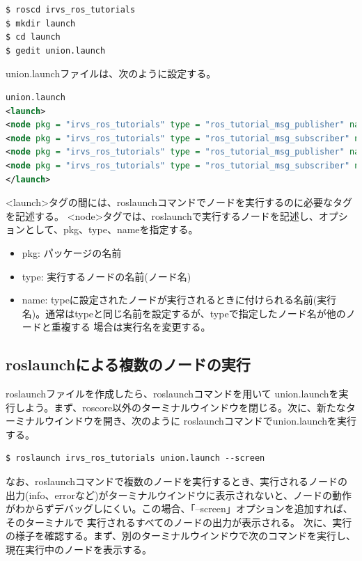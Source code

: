 \begin{lstlisting}[language=ROS]
$ roscd irvs_ros_tutorials
$ mkdir launch
$ cd launch
$ gedit union.launch
\end{lstlisting}

union.launchファイルは、次のように設定する。

\begin{lstlisting}[language=XML]
union.launch
<launch>
<node pkg = "irvs_ros_tutorials" type = "ros_tutorial_msg_publisher" name = "msg_publisher1" />
<node pkg = "irvs_ros_tutorials" type = "ros_tutorial_msg_subscriber" name = "msg_subscriber1" />
<node pkg = "irvs_ros_tutorials" type = "ros_tutorial_msg_publisher" name = "msg_publisher2" />
<node pkg = "irvs_ros_tutorials" type = "ros_tutorial_msg_subscriber" name = "msg_subscriber2" />
</launch>
\end{lstlisting}

<launch>タグの間には、roslaunchコマンドでノードを実行するのに必要なタグを記述する。 <node>タグでは、roslaunchで実行するノードを記述し、オプションとして、pkg、type、nameを指定する。

\begin{itemize}
\item  pkg: パッケージの名前
\item type: 実行するノードの名前(ノード名)
\item name:  typeに設定されたノードが実行されるときに付けられる名前(実行名)。通常はtypeと同じ名前を設定するが、typeで指定したノード名が他のノードと重複する  場合は実行名を変更する。
\end{itemize}

\subsection{roslaunchによる複数のノードの実行}

roslaunchファイルを作成したら、roslaunchコマンドを用いて  union.launchを実行しよう。まず、roscore以外のターミナルウインドウを閉じる。次に、新たなターミナルウインドウを開き、次のように  roslaunchコマンドでunion.launchを実行する。

\begin{lstlisting}[language=ROS]
$ roslaunch irvs_ros_tutorials union.launch --screen
\end{lstlisting}

なお、roslaunchコマンドで複数のノードを実行するとき、実行されるノードの出力(info、errorなど)がターミナルウインドウに表示されないと、ノードの動作がわからずデバッグしにくい。この場合、「--screen」オプションを追加すれば、そのターミナルで  実行されるすべてのノードの出力が表示される。
次に、実行の様子を確認する。まず、別のターミナルウインドウで次のコマンドを実行し、現在実行中のノードを表示する。

